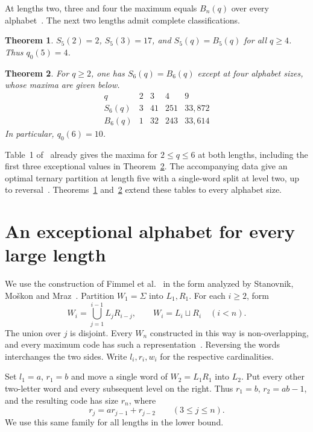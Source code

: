 \documentclass[11pt,a4paper]{article}
\newtheorem{theorem}{Theorem}
\begin{document}
At lengths two, three and four the maximum equals $B_n(q)$ over every alphabet~\cite{Blackburn,SMM}. The next two lengths admit complete classifications.
\begin{theorem}\label{th:five}
$S_5(2)=2$, $S_5(3)=17$, and $S_5(q)=B_5(q)$ for all $q\ge4$. Thus $q_0(5)=4$.
\end{theorem}
\begin{theorem}\label{th:six}
For $q\ge2$, one has $S_6(q)=B_6(q)$ except at four alphabet sizes, whose maxima are given below.
\[
\begin{array}{c|rrrr}
q&2&3&4&9\\\hline
S_6(q)&3&41&251&33{,}872\\
B_6(q)&1&32&243&33{,}614
\end{array}
\]
In particular, $q_0(6)=10$.
\end{theorem}

Table~1 of~\cite{SMM} already gives the maxima for $2\le q\le6$ at both lengths, including the first three exceptional values in Theorem~\ref{th:six}. The accompanying data give an optimal ternary partition at length five with a single-word split at level two, up to reversal~\cite{SMMdata}. Theorems~\ref{th:five} and~\ref{th:six} extend these tables to every alphabet size.

\section{An exceptional alphabet for every large length}

We use the construction of Fimmel et al.~\cite{Fimmel} in the form analyzed by Stanovnik, Mo\v{s}kon and Mraz~\cite[Construction~6]{SMM}. Partition $W_1=\Sigma$ into $L_1,R_1$. For each $i\ge2$, form
\begin{equation}\label{eq:levels}
 W_i=\bigcup_{j=1}^{i-1}L_jR_{i-j},
 \qquad W_i=L_i\sqcup R_i\quad (i<n).
\end{equation}
The union over $j$ is disjoint. Every $W_n$ constructed in this way is non-overlapping, and every maximum code has such a representation~\cite[Theorems~3 and 6, Proposition~7]{SMM}. Reversing the words interchanges the two sides. Write $l_i,r_i,w_i$ for the respective cardinalities.

Set $l_1=a$, $r_1=b$ and move a single word of $W_2=L_1R_1$ into $L_2$. Put every other two-letter word and every subsequent level on the right. Thus $r_1=b$, $r_2=ab-1$, and the resulting code has size $r_n$, where
\[
 r_j=ar_{j-1}+r_{j-2}\qquad (3\le j\le n).
\]
We use this same family for all lengths in the lower bound.
\end{document}
